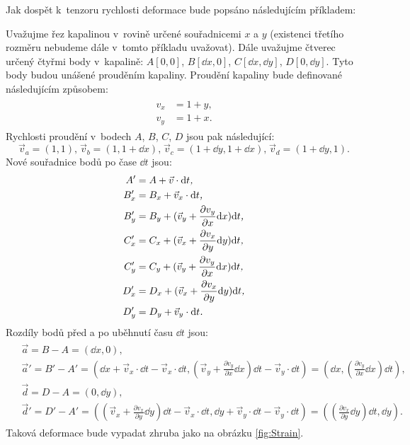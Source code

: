 \documentclass[12pt]{article}
\begin{document}
Jak dospět k~tenzoru rychlosti deformace bude popsáno následujícím příkladem:
\par \noindent
Uvažujme řez kapalinou v~rovině určené souřadnicemi $x$ a $y$ (existenci třetího rozměru nebudeme dále v~tomto příkladu uvažovat). Dále uvažujme čtverec určený čtyřmi body v~kapalině: $A[0,0]$, $B[\dd x,0]$, $C[\dd x,\dd y]$, $D[0,\dd y]$. Tyto body budou unášené prouděním kapaliny. Proudění kapaliny bude definované následujícím způsobem:
\begin{align}
    \begin{split}
        v_x &= 1 + y\text{,} \\
        v_y &= 1 + x\text{.}
    \end{split}
\end{align}
Rychlosti proudění v~bodech $A$, $B$, $C$, $D$ jsou pak následující:
\begin{equation}
    \vec{v}_a = (1,1)\text{,} \;
    \vec{v}_b = (1,1 + \dd x)\text{,} \;
    \vec{v}_c = (1 + \dd y,1 + \dd x)\text{,} \;
    \vec{v}_d = (1 + \dd y,1)\text{.}
\end{equation}
Nové souřadnice bodů po čase $\dd t$ jsou:
\begin{align}
    \begin{split}
        A' &= A + \vec{v}\cdot \dd t\emph{,}\\
        B'_x &= B_x + \vec{v}_x \cdot \dd t\emph{,}\\
        B'_y &= B_y + (\vec{v}_y + \frac{\partial v_y}{\partial x}\dd x) \dd t\emph{,}\\
        C'_x &= C_x + (\vec{v}_x + \frac{\partial v_x}{\partial y}\dd y) \dd t\emph{,}\\
        C'_y &= C_y + (\vec{v}_y + \frac{\partial v_y}{\partial x}\dd x) \dd t\emph{,}\\
        D'_x &= D_x + (\vec{v}_x + \frac{\partial v_x}{\partial y}\dd y) \dd t\emph{,}\\
        D'_y &= D_y + \vec{v}_y \cdot \dd t \emph{.}
    \end{split}
\end{align}
Rozdíly bodů před a po uběhnutí času $\dd t$ jsou:
\begin{align}
    \begin{split}
        &\vec{a} = B-A = (\dd x,0)\text{,}\\
        &\vec{a}' = B'-A' = \left(\dd x + \vec{v}_x \cdot \dd t - \vec{v}_x \cdot \dd t, \left(\vec{v}_y + \frac{\partial v_y}{\partial x}\dd x\right)\dd t - \vec{v}_y \cdot \dd t\right) = \left(\dd x, \left(\frac{\partial v_y}{\partial x}\dd x\right)\dd t\right)\text{,}\\
        &\vec{d} = D-A = (0,\dd y)\text{,}\\
        &\vec{d}' = D'-A' = \left(\left(\vec{v}_x + \frac{\partial v_x}{\partial y}\dd y\right) \dd t - \vec{v}_x\cdot \dd t, \dd y + \vec{v}_y \cdot \dd t - \vec{v}_y\cdot \dd t\right) = \left(\left(\frac{\partial v_x}{\partial y}\dd y\right)\dd t,\dd y\right)\text{.}
    \end{split}
\end{align}
Taková deformace bude vypadat zhruba jako na obrázku \ref{fig:Strain}.
\end{document}

